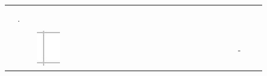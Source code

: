 \documentclass[10pt]{article}
\begin{document}
\begin{center}
\begin{tabular}{|c|c|c|c|c|c|c|c|c|c|c|c|c|c|c|c|c|c|c|c|c|c|c|c|c|c|c|}
\hline
 &  &  &  &  &  &  &  &  &  &  &  &  &  &  &  &  &  &  &  &  &  &  &  &  &  &  \\
\hline
 &  &  &  &  &  &  &  &  &  &  &  &  &  &  &  &  &  &  &  &  &  &  &  &  &  &  \\
\hline
 &  &  &  &  &  &  &  &  &  &  &  &  &  &  &  &  &  &  &  &  &  &  &  &  &  &  \\
\hline
 & . &  &  &  &  &  &  &  &  &  &  &  &  &  &  &  &  &  &  &  &  &  &  &  &  &  \\
\hline
 &  &  &  &  &  &  &  &  &  &  &  &  &  &  &  &  &  &  &  &  &  &  &  &  &  &  \\
\hline
 &  &  & \includegraphics[max width=\textwidth]{2024_11_21_d51d653f4fe4a5bb0c33g-15(7)}
 &  &  &  &  &  &  &  &  &  &  &  &  &  &  &  &  &  &  &  &  & - &  &  \\

\end{tabular}
\end{center}
\end{document}
